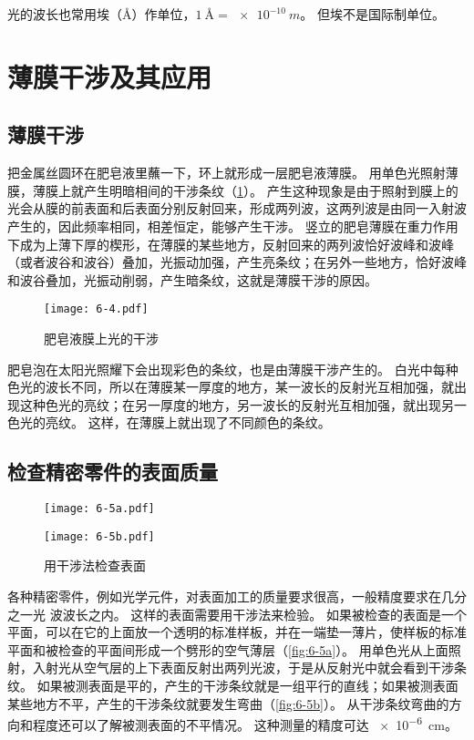 光的波长也常用埃（\AA）作单位，$\qty{1}{\text{\AA}}=\qty{e-10}{m}$。
但埃不是国际制单位。

\section{薄膜干涉及其应用}
\subsection{薄膜干涉}
把金属丝圆环在肥皂液里蘸一下，环上就形成一层肥皂液薄膜。
用单色光照射薄膜，薄膜上就产生明暗相间的干涉条纹（\cref{fig:6-4}）。
产生这种现象是由于照射到膜上的光会从膜的前表面和后表面分别反射回来，形成两列波，这两列波是由同一入射波产生的，因此频率相同，相差恒定，能够产生干涉。
竖立的肥皂薄膜在重力作用下成为上薄下厚的楔形，在薄膜的某些地方，反射回来的两列波恰好波峰和波峰（或者波谷和波谷）叠加，光振动加强，产生亮条纹；在另外一些地方，恰好波峰和波谷叠加，光振动削弱，产生暗条纹，这就是薄膜干涉的原因。
\begin{figure}
  \texttt{[image: 6-4.pdf]}
  \caption{肥皂液膜上光的干涉}\label{fig:6-4}
\end{figure}

肥皂泡在太阳光照耀下会出现彩色的条纹，也是由薄膜干涉产生的。
白光中每种色光的波长不同，所以在薄膜某一厚度的地方，某一波长的反射光互相加强，就出现这种色光的亮纹；在另一厚度的地方，另一波长的反射光互相加强，就出现另一色光的亮纹。
这样，在薄膜上就出现了不同颜色的条纹。

\subsection{检查精密零件的表面质量}
\begin{figure}
  \begin{minipage}[b]{0.45\linewidth}\centering
    \texttt{[image: 6-5a.pdf]}
    \subcaption{}\label{fig:6-5a}
  \end{minipage}
  \begin{minipage}[b]{0.45\linewidth}\centering
    \texttt{[image: 6-5b.pdf]}
    \subcaption{}\label{fig:6-5b}
  \end{minipage}
  \caption{用干涉法检查表面}\label{fig:6-5}
\end{figure}

各种精密零件，例如光学元件，对表面加工的质量要求很高，一般精度要求在几分之一光
波波长之内。
这样的表面需要用干涉法来检验。
如果被检查的表面是一个平面，可以在它的上面放一个透明的标准样板，并在一端垫一薄片，使样板的标准平面和被检查的平面间形成一个劈形的空气薄层（\cref{fig:6-5a}）。
用单色光从上面照射，入射光从空气层的上下表面反射出两列光波，于是从反射光中就会看到干涉条纹。
如果被测表面是平的，产生的干涉条纹就是一组平行的直线；如果被测表面某些地方不平，产生的干涉条纹就要发生弯曲（\cref{fig:6-5b}）。
从干涉条纹弯曲的方向和程度还可以了解被测表面的不平情况。
这种测量的精度可达 \qty{e-6}{cm}。

